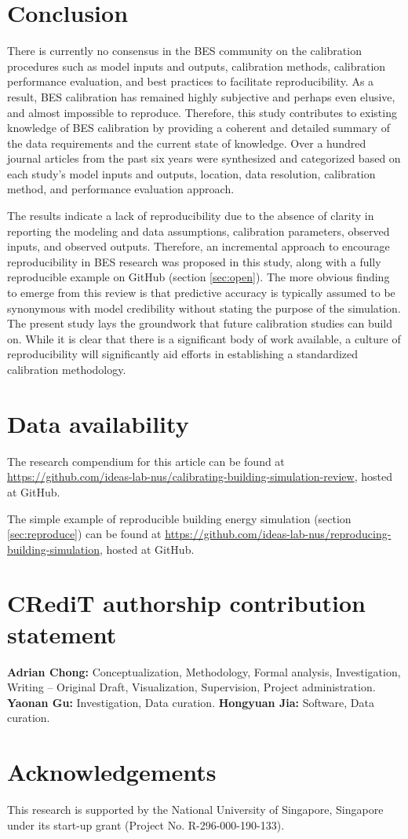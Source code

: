 \documentclass[review]{elsarticle}
\begin{document}
\section{Conclusion}

There is currently no consensus in the BES community on the calibration procedures such as model inputs and outputs, calibration methods, calibration performance evaluation, and best practices to facilitate reproducibility. As a result, BES calibration has remained highly subjective and perhaps even elusive, and almost impossible to reproduce. Therefore, this study contributes to existing knowledge of BES calibration by providing a coherent and detailed summary of the data requirements and the current state of knowledge. Over a hundred journal articles from the past six years were synthesized and categorized based on each study's model inputs and outputs, location, data resolution, calibration method, and performance evaluation approach. 

The results indicate a lack of reproducibility due to the absence of clarity in reporting the modeling and data assumptions, calibration parameters, observed inputs, and observed outputs. Therefore, an incremental approach to encourage reproducibility in BES research was proposed in this study, along with a fully reproducible example on GitHub (section \ref{sec:open}). The more obvious finding to emerge from this review is that predictive accuracy is typically assumed to be synonymous with model credibility without stating the purpose of the simulation. The present study lays the groundwork that future calibration studies can build on. While it is clear that there is a significant body of work available, a culture of reproducibility will significantly aid efforts in establishing a standardized calibration methodology. 

\section*{Data availability} \label{sec:open}

The research compendium for this article can be found at \url{https://github.com/ideas-lab-nus/calibrating-building-simulation-review}, hosted at GitHub.

The simple example of reproducible building energy simulation (section \ref{sec:reproduce}) can be found at \url{https://github.com/ideas-lab-nus/reproducing-building-simulation}, hosted at GitHub.


\section*{CRediT authorship contribution statement}
\textbf{Adrian Chong:} Conceptualization, Methodology, Formal analysis, Investigation, Writing – Original Draft, Visualization, Supervision, Project administration. \textbf{Yaonan Gu:} Investigation, Data curation. \textbf{Hongyuan Jia:} Software, Data curation.


\section*{Acknowledgements}
This research is supported by the National University of Singapore, Singapore under its start-up grant (Project No. R-296-000-190-133).



\end{document}
